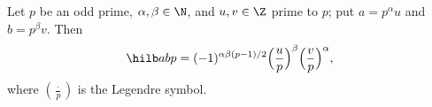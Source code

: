Let $p$ be an odd prime, $\alpha,\beta\in\N$, and $u,v\in\Z$ prime to $p$; put $a=p^\alpha u$ and $b=p^\beta v$. Then
\[
  \hilb abp=(-1)^{\alpha\beta(p-1)/2}\Bigl(\frac up\Bigr)^{\beta}\Bigl(\frac vp\Bigr)^{\alpha},
\]
where $(\frac{\cdot}{p})$ is the Legendre symbol.
